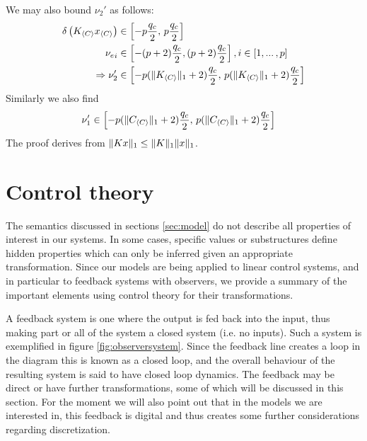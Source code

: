 \documentclass[sigconf]{llncs}
\DeclarePairedDelimiter\norm{\lVert}{\rVert}
\newcommand{\mat}[1]{{#1}}
\renewcommand{\vec}[1]{{#1}}
\begin{document}
We may also bound $\nu_2'$ as follows:
\begin{align*}
\delta\left(\mat{K}_{\langle C\rangle} \vec{x}_{\langle C\rangle} \right) &\in \left[ -p \frac{q_c}{2},\, p \frac{q_c}{2}\right]\\
{\vec{\nu_e}}_i &\in \left[ -(p+2) \frac{q_c}{2}, (p+2) \frac{q_c}{2}\right], i \in [1, ...\,,p]\\
\Rightarrow \nu_2' &\in \left[  -p(\norm{\mat{K}_{\langle C \rangle}}_1+2) \frac{q_c}{2},\, p(\norm{\mat{K}_{\langle C \rangle}}_1+2) \frac{q_c}{2}\right]
\end{align*}
Similarly we also find
\begin{align*}
\nu_1' &\in \left[  -p(\norm{\mat{C}_{\langle C \rangle}}_1+2) \frac{q_c}{2},\, p(\norm{\mat{C}_{\langle C \rangle}}_1+2) \frac{q_c}{2}\right]
\end{align*}
The proof derives from $\norm{\mat{K}\vec{x}}_1 \leq \norm{\mat{K}}_1\norm{\vec{x}}_1$.

\section{Control theory} \label{sec:control_theory}

The semantics discussed in sections \ref{sec:model} do not describe all
properties of interest in our systems.  In some cases, specific values or
substructures define hidden properties which can only be inferred given an
appropriate transformation.  Since our models are being applied to linear
control systems, and in particular to feedback systems with observers, we
provide a summary of the important elements using control theory for their
transformations.

A feedback system is one where the output is fed back into the input, thus
making part or all of the system a closed system (i.e. no inputs).
Such a system is exemplified in figure \ref{fig:observersystem}.  Since the
feedback line creates a loop in the diagram this is known as a closed loop,
and the overall behaviour of the resulting system is said to have closed loop dynamics.
The feedback may be direct or have further transformations, some of which will
be discussed in this section.  For the moment we will also point out that in the
models we are interested in, this feedback is digital and thus creates some
further considerations regarding discretization.
\end{document}

